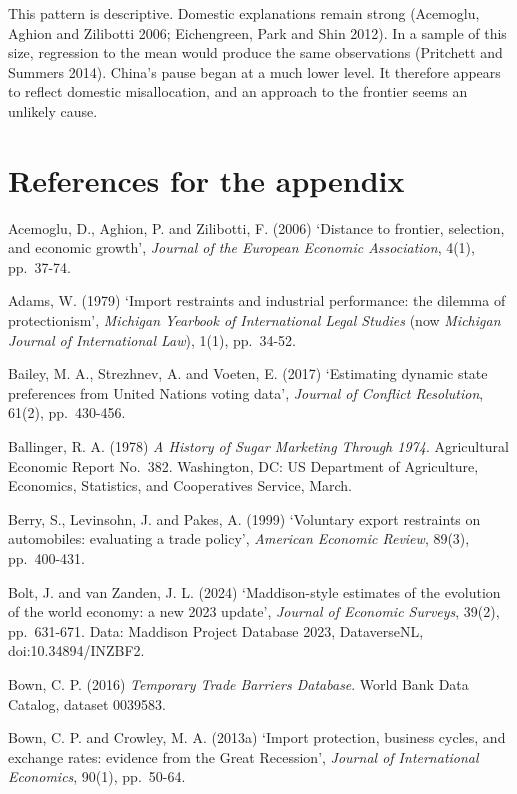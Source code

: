 This pattern is descriptive. Domestic explanations remain strong
(Acemoglu, Aghion and Zilibotti 2006; Eichengreen, Park and Shin 2012).
In a sample of this size, regression to the mean would produce the same
observations (Pritchett and Summers 2014). China's pause began at a much
lower level. It therefore appears to reflect domestic misallocation, and
an approach to the frontier seems an unlikely cause.

\hypertarget{references-for-the-appendix}{%
\section*{References for the
appendix}\label{references-for-the-appendix}}

Acemoglu, D., Aghion, P. and Zilibotti, F. (2006) `Distance to frontier,
selection, and economic growth', \emph{Journal of the European Economic
Association}, 4(1), pp.~37-74.

Adams, W. (1979) `Import restraints and industrial performance: the
dilemma of protectionism', \emph{Michigan Yearbook of International
Legal Studies} (now \emph{Michigan Journal of International Law}), 1(1),
pp.~34-52.

Bailey, M. A., Strezhnev, A. and Voeten, E. (2017) `Estimating dynamic
state preferences from United Nations voting data', \emph{Journal of
Conflict Resolution}, 61(2), pp.~430-456.

Ballinger, R. A. (1978) \emph{A History of Sugar Marketing Through
1974}. Agricultural Economic Report No.~382. Washington, DC: US
Department of Agriculture, Economics, Statistics, and Cooperatives
Service, March.

Berry, S., Levinsohn, J. and Pakes, A. (1999) `Voluntary export
restraints on automobiles: evaluating a trade policy', \emph{American
Economic Review}, 89(3), pp.~400-431.

Bolt, J. and van Zanden, J. L. (2024) `Maddison-style estimates of the
evolution of the world economy: a new 2023 update', \emph{Journal of
Economic Surveys}, 39(2), pp.~631-671. Data: Maddison Project Database
2023, DataverseNL, doi:10.34894/INZBF2.

Bown, C. P. (2016) \emph{Temporary Trade Barriers Database}. World Bank
Data Catalog, dataset 0039583.

Bown, C. P. and Crowley, M. A. (2013a) `Import protection, business
cycles, and exchange rates: evidence from the Great Recession',
\emph{Journal of International Economics}, 90(1), pp.~50-64.

